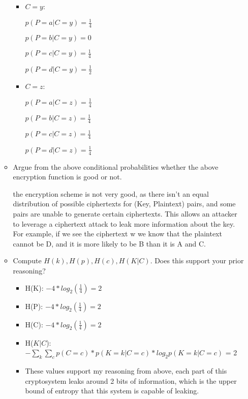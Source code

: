 \documentclass[12pt]{article}
\begin{document}
\begin{enumerate}
\begin{itemize}
\begin{itemize}
          \item $C=y$: \par$p(P=a|C=y)=\frac{1}{4}$\par$p(P=b|C=y)=0$\par$p(P=c|C=y)=\frac{1}{4}$\par$p(P=d|C=y)=\frac{1}{2}$ 

          \item $C=z$: \par$p(P=a|C=z)=\frac{1}{4}$\par$p(P=b|C=z)=\frac{1}{4}$\par$p(P=c|C=z)=\frac{1}{4}$\par$p(P=d|C=z)=\frac{1}{4}$ 


        \end{itemize}

      \item Argue from the above conditional probabilities whether the above encryption function is good or not.
        \par the encryption scheme is not very good, as there isn't an equal distribution of possible ciphertexts for (Key, Plaintext) pairs, and some pairs are unable to generate certain ciphertexts.  This allows an attacker to leverage a ciphertext attack to leak more information about the key.
        For example, if we see the ciphertext w we know that the plaintext cannot be D, and it is more likely to be B than it is A and C.

      \item Compute $H(k), H(p), H(c), H(K|C)$.  Does this support your prior reasoning?
        \begin{itemize}
          \item H(K): $-4*log_2(\frac{1}{4}) = 2$
          \item H(P): $-4*log_2(\frac{1}{4}) = 2$
          \item H(C): $-4*log_2(\frac{1}{4}) = 2$
          \item H($K|C$): $-\sum_{k}\sum_{c} p(C=c)*p(K=k|C=c)*log_2p(K=k|C=c)$ = 2
          \item These values support my reasoning from above, each part of this cryptosystem leaks around 2 bits of information, which is the upper bound of entropy that this system is capable of leaking.
        \end{itemize}
    \end{itemize}


\end{enumerate}
\end{document}
